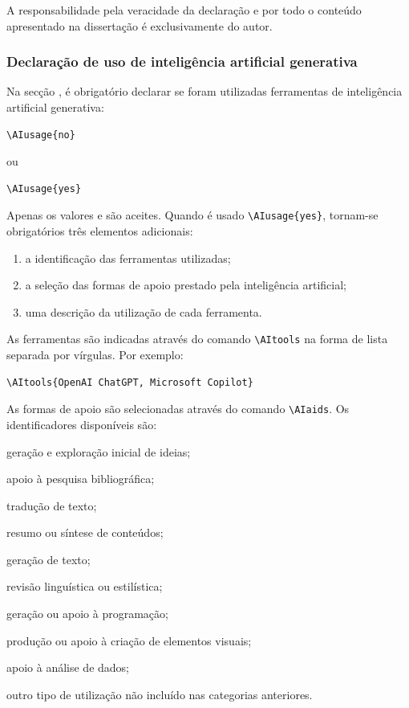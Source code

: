 A responsabilidade pela veracidade da declaração e por todo o conteúdo apresentado na dissertação é exclusivamente do autor.

\subsubsection*{Declaração de uso de inteligência artificial generativa}
\label{subsec:ai-template}

Na secção , é obrigatório declarar se foram utilizadas ferramentas de inteligência artificial generativa:
\begin{verbatim}
\AIusage{no}
\end{verbatim}
ou
\begin{verbatim}
\AIusage{yes}
\end{verbatim}

Apenas os valores  e  são aceites. Quando é usado \verb|\AIusage{yes}|, tornam-se obrigatórios três elementos adicionais:
\begin{enumerate}
    \item a identificação das ferramentas utilizadas;
    \item a seleção das formas de apoio prestado pela inteligência artificial;
    \item uma descrição da utilização de cada ferramenta.
\end{enumerate}

As ferramentas são indicadas através do comando \verb|\AItools| na forma de lista separada por vírgulas. Por exemplo:
\begin{verbatim}
\AItools{OpenAI ChatGPT, Microsoft Copilot}
\end{verbatim}

As formas de apoio são selecionadas através do comando \verb|\AIaids|. Os identificadores disponíveis são:

\begin{description}[
  leftmargin=4.2cm,
  labelwidth=3.8cm,
  labelsep=0.4cm,
  style=multiline
]
    \item[\code{brainstorming}] geração e exploração inicial de ideias;
    \item[\code{literature-search}] apoio à pesquisa bibliográfica;
    \item[\code{translation}] tradução de texto;
    \item[\code{summarization}] resumo ou síntese de conteúdos;
    \item[\code{text-generation}] geração de texto;
    \item[\code{text-review}] revisão linguística ou estilística;
    \item[\code{code-generation}] geração ou apoio à programação;
    \item[\code{visualization}] produção ou apoio à criação de elementos visuais;
    \item[\code{data-analysis}] apoio à análise de dados;
    \item[\code{other}] outro tipo de utilização não incluído nas categorias
    anteriores.
\end{description}


